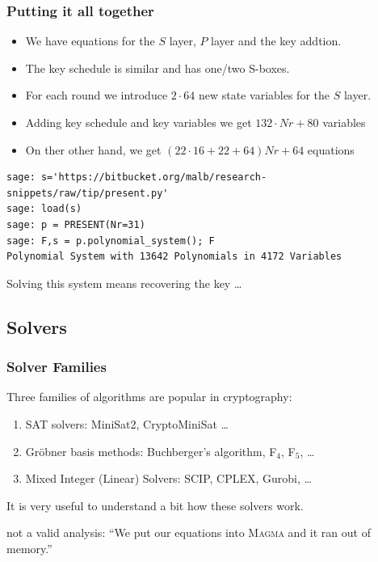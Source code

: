 \documentclass[9pt]{beamer}
\begin{document}
\begin{frame}[fragile]
\frametitle{Putting it all together} 

\begin{itemize}
 \item We have equations for the $S$ layer, $P$ layer and the key addtion.
 \item The key schedule is similar and has one/two S-boxes. 
 \item For each round we introduce $2 \cdot 64$ new state variables for the $S$ layer.
 \item Adding key schedule and key variables we get $132 \cdot Nr +80$ variables
 \item On ther other hand, we get $(22 ⋅ 16 + 22 + 64)Nr + 64$ equations
\end{itemize}

\begin{lstlisting}
sage: s='https://bitbucket.org/malb/research-snippets/raw/tip/present.py'
sage: load(s)
sage: p = PRESENT(Nr=31)
sage: F,s = p.polynomial_system(); F
Polynomial System with 13642 Polynomials in 4172 Variables
\end{lstlisting}

\begin{block}{}
Solving this system means recovering the key \dots
\end{block}
\end{frame}


\subsection{Solvers}

\begin{frame}
\frametitle{Solver Families} 

\vfill

Three families of algorithms are popular in cryptography:

\vspace{1em}

\begin{enumerate}
 \item SAT solvers: MiniSat2, CryptoMiniSat \dots
 \item Gröbner basis methods: Buchberger's algorithm, F$_4$, F$_5$, \dots
 \item Mixed Integer (Linear) Solvers: SCIP, CPLEX, Gurobi, \dots
\end{enumerate}

\vspace{1em}

It is very useful to understand a bit how these solvers work.

\vspace{1em}

\begin{block}{not a valid analysis:}
``We put our equations into \textsc{Magma} and it ran out of memory.''
\end{block}

\vfill

\end{frame}
\end{document}
